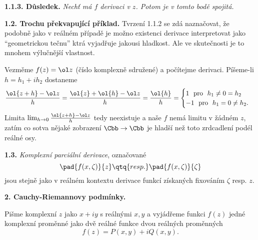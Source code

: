 \documentclass[12pt]{article}
\begin{document}
\medskip

{\bf 1.1.3. Důsledek.} {\em Nechť má $f$ derivaci v $z$. Potom je v tomto bodě spojitá.}

\bigskip

{\bf 1.2. Trochu překvapující příklad.} Tvrzení 1.1.2 se zdá naznačovat, že podobně jako v reálném případě je možno existenci derivace interpretovat jako ``geometrickou tečnu'' ktrá vyjadřuje jakousi hladkost. Ale ve skutečnosti je to mnohem výlučnější vlastnost.

 Vezměme $f(z)=\ol z$ (číslo komplexně sdružené) a počítejme derivaci. Píšeme-li  $h=h_1+ih_2$ dostaneme
 $$
 \frac{\ol{z+h}-\ol z}{h}=\frac{\ol{z}+\ol{h}-\ol z}{h}=\frac{\ol{h}}{h}=\begin{cases} 1\ \ \text{pro}\ \ h_1\neq 0=h_2\\
                                                               -1\ \ \text{pro}\ \ h_1= 0\neq h_2.
\end{cases} 
$$                                                              
 Limita $\lim_{h\to 0}\frac{\ol{z+h}-\ol z}{h}$ tedy neexistuje a naše $f$ nemá limitu v žádném $z$, 
zatím co sotva nějaké zobrazení $\Cbb\to\Cbb$ je hladší než toto zrdcadlení podél reálné osy.
 
 \bigskip
 

 {\bf 1.3.} {\em Komplexní parciální derivace}, označované
 $$
 \pad{f(x,\zeta)}{z} \qtq{resp.} \pad{f(x,\zeta)}{\zeta}
 $$ 
 jsou stejně jako v reálném kontextu derivace funkcí získaných fixováním $\zeta$ resp. $z$.
 
 
 
 \vskip10mm
 
 {\large\bf 2. Cauchy-Riemannovy podmínky.}
 
 \bigskip
 
 Pišme komplexní $z$ jako $x+iy$ s reálnými $x,y$ a vyjádřeme funkci $f(z)$ jedné komplexní proměnné jako dvě reálné funkce dvou reálných proměnných 
 $$
 f(z)=P(x,y)+iQ(x,y).
 $$
 
 \medskip
 
\end{document}
